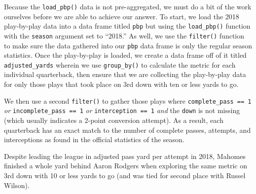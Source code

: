 \documentclass[
  letterpaper,
]{krantz}
\begin{document}
Because the \texttt{load\_pbp()} data is not pre-aggregated, we must do
a bit of the work ourselves before we are able to achieve our answer. To
start, we load the 2018 play-by-play data into a data frame titled
\texttt{pbp} but using the \texttt{load\_pbp()} function with the
\texttt{season} argument set to ``2018.'' As well, we use the
\texttt{filter()} function to make sure the data gathered into our
\texttt{pbp} data frame is only the regular season statistics. Once the
play-by-play is loaded, we create a data frame off of it titled
\texttt{adjusted\_yards} wherein we use \texttt{group\_by()} to
calculate the metric for each individual quarterback, then ensure that
we are collecting the play-by-play data for only those plays that took
place on 3rd down with ten or less yards to go.

We then use a second \texttt{filter()} to gather those plays where
\texttt{complete\_pass\ ==\ 1} \emph{or}
\texttt{incomplete\_pass\ ==\ 1} \emph{or} \texttt{interception\ ==\ 1}
\emph{and} the \texttt{down} is not missing (which usually indicates a
2-point conversion attempt). As a result, each quarterback has an exact
match to the number of complete passes, attempts, and interceptions as
found in the official statistics of the season.

Despite leading the league in adjusted pass yard per attempt in 2018,
Mahomes finished a whole yard behind Aaron Rodgers when exploring the
same metric on 3rd down with 10 or less yards to go (and was tied for
second place with Russel Wilson).
\end{document}
